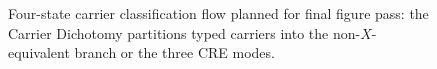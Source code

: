 \begin{figure}[tbp]
  \centering
  \caption{Four-state carrier classification flow planned for final figure pass: the Carrier Dichotomy partitions typed carriers into the non-\(X\)-equivalent branch or the three CRE modes.}
  \label{fig:four-state-classification}
\end{figure}
